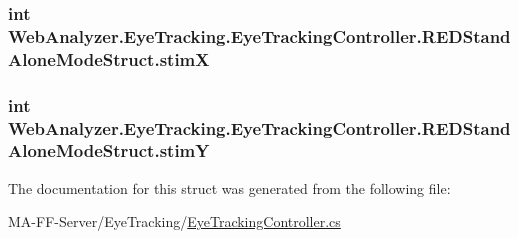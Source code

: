 \subsubsection[{stim\+X}]{\setlength{\rightskip}{0pt plus 5cm}int Web\+Analyzer.\+Eye\+Tracking.\+Eye\+Tracking\+Controller.\+R\+E\+D\+Stand\+Alone\+Mode\+Struct.\+stim\+X}\label{struct_web_analyzer_1_1_eye_tracking_1_1_eye_tracking_controller_1_1_r_e_d_stand_alone_mode_struct_aa155f1c99fa1d08ee3c65ac0a1363671}
\hypertarget{struct_web_analyzer_1_1_eye_tracking_1_1_eye_tracking_controller_1_1_r_e_d_stand_alone_mode_struct_a46cc02eae0a855e5eb072465c2f71b20}{}
\subsubsection[{stim\+Y}]{\setlength{\rightskip}{0pt plus 5cm}int Web\+Analyzer.\+Eye\+Tracking.\+Eye\+Tracking\+Controller.\+R\+E\+D\+Stand\+Alone\+Mode\+Struct.\+stim\+Y}\label{struct_web_analyzer_1_1_eye_tracking_1_1_eye_tracking_controller_1_1_r_e_d_stand_alone_mode_struct_a46cc02eae0a855e5eb072465c2f71b20}


The documentation for this struct was generated from the following file\+:\begin{DoxyCompactItemize}
\item 
M\+A-\/\+F\+F-\/\+Server/\+Eye\+Tracking/\hyperlink{_eye_tracking_controller_8cs}{Eye\+Tracking\+Controller.\+cs}\end{DoxyCompactItemize}
